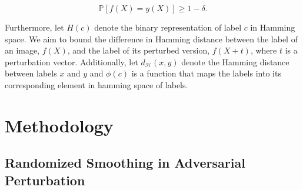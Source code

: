 \documentclass{article}
\theoremstyle{plain}
\theoremstyle{definition}
\theoremstyle{remark}
\begin{document}
\[
\mathbb{P}[f(X) = y(X)] \geq 1-\delta.
\]

Furthermore, let \( H(c) \) denote the binary representation of label \( c \) in Hamming space. We aim to bound the difference in Hamming distance between the label of an image, \( f(X) \), and the label of its perturbed version, \( f(X+t) \), where \( t \) is a perturbation vector. Additionally, let \( d_{\mathcal{H}}(x,y) \) denote the Hamming distance between labels \( x \) and \( y \) and $\phi(c)$ is a function that maps the labels into its corresponding element in hamming space of labels.
\section{Methodology}  

\subsection{Randomized Smoothing in Adversarial Perturbation}
\end{document}
